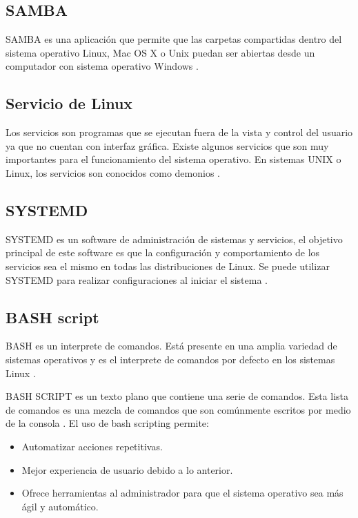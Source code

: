 \subsection{SAMBA}
SAMBA es una aplicación que permite que las carpetas compartidas dentro del sistema operativo Linux, Mac OS X o Unix  puedan ser abiertas desde un computador con sistema operativo Windows \citep{WIKISAMBA}.

\subsection{Servicio de Linux}

Los servicios son programas que se ejecutan fuera de la vista y control del usuario ya que no cuentan con interfaz gráfica. Existe algunos servicios que son muy importantes para el funcionamiento del sistema operativo.
En sistemas UNIX o Linux, los servicios son conocidos como demonios \citep{SERVICIO}.

\subsection{SYSTEMD}

SYSTEMD es un software de administración de sistemas y servicios, el objetivo principal de este software es que la configuración y comportamiento de los servicios sea el mismo en todas las distribuciones de Linux. Se puede utilizar SYSTEMD para realizar configuraciones al iniciar el sistema \citep{REFSYSTEMD}.

\subsection{BASH script}
BASH es un interprete de comandos. Está presente en una amplia variedad de sistemas operativos y es el interprete de comandos por defecto en los sistemas Linux \citep{BASH}. 


BASH SCRIPT es un texto plano que contiene una serie de comandos. Esta lista de comandos es una mezcla de comandos que son comúnmente escritos por medio de la consola \citep{BASHSCRIPT}. El uso de bash scripting permite:

\begin{itemize}
\item Automatizar acciones repetitivas.
\item Mejor experiencia de usuario debido a lo anterior.
\item Ofrece herramientas al administrador para que el sistema operativo sea más ágil y automático.
\end{itemize}

